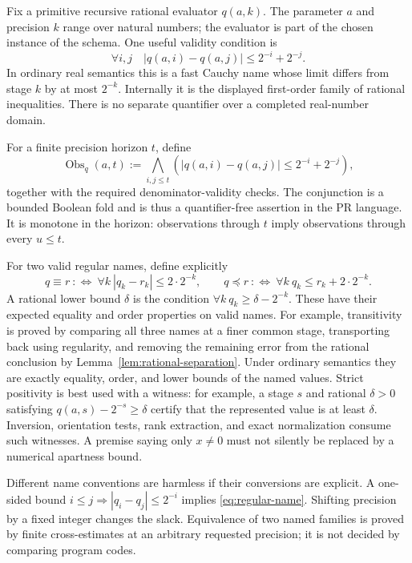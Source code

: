 Fix a primitive recursive rational evaluator \(q(a,k)\).  The parameter
\(a\) and precision \(k\) range over natural numbers; the evaluator is
part of the chosen instance of the schema.  One useful validity condition is
\begin{equation}\label{eq:regular-name}
 \forall i,j\quad
 |q(a,i)-q(a,j)|\le 2^{-i}+2^{-j}.
\end{equation}
In ordinary real semantics this is a fast Cauchy name whose limit differs
from stage \(k\) by at most \(2^{-k}\).  Internally it is the displayed
first-order family of rational inequalities.  There is no separate
quantifier over a completed real-number domain.

For a finite precision horizon \(t\), define
\begin{equation}\label{eq:finite-observation}
 \operatorname{Obs}_q(a,t):=
 \bigwedge_{i,j\le t}
 \left(|q(a,i)-q(a,j)|\le 2^{-i}+2^{-j}\right),
\end{equation}
together with the required denominator-validity checks.  The conjunction
is a bounded Boolean fold and is thus a quantifier-free assertion in the
PR language.  It is monotone in the horizon: observations through \(t\)
imply observations through every \(u\le t\).

For two valid regular names, define explicitly
\[
 q\equiv r\ :\Longleftrightarrow\
 \forall k\ |q_k-r_k|\le2\cdot2^{-k},\qquad
 q\preceq r\ :\Longleftrightarrow\
 \forall k\ q_k\le r_k+2\cdot2^{-k}.
\]
A rational lower bound \(\delta\) is the condition
\(\forall k\ q_k\ge\delta-2^{-k}\).
These have their expected equality and order properties on valid names.
For example, transitivity is proved by comparing all three names at a
finer common stage, transporting back using regularity, and removing the
remaining error from the rational conclusion by
Lemma~\ref{lem:rational-separation}.  Under ordinary semantics they are
exactly equality, order, and lower bounds of the named values.
Strict positivity is best used with a witness: for example,
a stage \(s\) and rational \(\delta>0\) satisfying
\(q(a,s)-2^{-s}\ge\delta\) certify that the represented value is at least
\(\delta\).  Inversion, orientation tests, rank extraction, and exact
normalization consume such witnesses.  A premise saying only
\(x\ne0\) must not silently be replaced by a numerical apartness bound.

Different name conventions are harmless if their conversions are
explicit.  A one-sided bound
\(i\le j\Rightarrow|q_i-q_j|\le2^{-i}\) implies
\eqref{eq:regular-name}.  Shifting precision by a fixed integer changes
the slack.  Equivalence of two named families is proved by finite
cross-estimates at an arbitrary requested precision; it is not decided
by comparing program codes.


